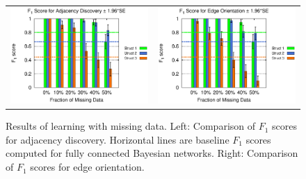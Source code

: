 \documentclass{edm_template}
\begin{document}
{		\begin{figure}%
			\begin{center}
				\centering
				\begin{tabular}{>{\centering}m{1.5in} >{\centering\arraybackslash}m{1.5in}}
					\includegraphics[width=1.2\linewidth]{figures/F1A_single_missing.eps} &\includegraphics[width=1.2\linewidth]{figures/F1O_single_missing.eps}\\
				\end{tabular}
			\end{center}
			\caption{Results of learning with missing data. Left: Comparison of $F_1$ scores for adjacency discovery. Horizontal lines are baseline $F_1$ scores computed for fully connected Bayesian networks. Right: Comparison of $F_1$ scores for edge orientation. }
			\label{fig:f1-missing} 
		\end{figure}  

}
\end{document}
